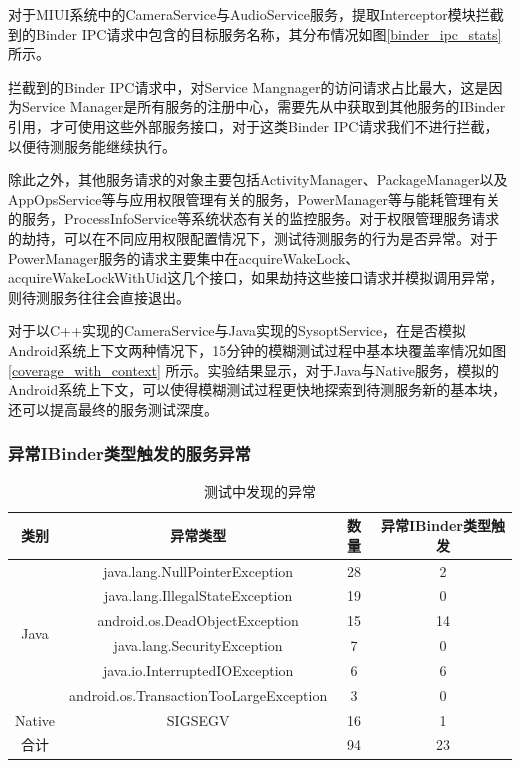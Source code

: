 \documentclass[winfonts,master,twoside]{njuthesis}
\begin{document}
对于MIUI系统中的CameraService与AudioService服务，提取Interceptor模块拦截到的Binder IPC请求中包含的目标服务名称，其分布情况如图\ref{binder_ipc_stats} 所示。

拦截到的Binder IPC请求中，对Service Mangnager的访问请求占比最大，这是因为Service Manager是所有服务的注册中心，需要先从中获取到其他服务的IBinder引用，才可使用这些外部服务接口，对于这类Binder IPC请求我们不进行拦截，以便待测服务能继续执行。

除此之外，其他服务请求的对象主要包括ActivityManager、PackageManager以及AppOpsService等与应用权限管理有关的服务，PowerManager等与能耗管理有关的服务，ProcessInfoService等系统状态有关的监控服务。对于权限管理服务请求的劫持，可以在不同应用权限配置情况下，测试待测服务的行为是否异常。对于PowerManager服务的请求主要集中在acquireWakeLock、acquireWakeLockWithUid这几个接口，如果劫持这些接口请求并模拟调用异常，则待测服务往往会直接退出。


对于以C++实现的CameraService与Java实现的SysoptService，在是否模拟Android系统上下文两种情况下，15分钟的模糊测试过程中基本块覆盖率情况如图\ref{coverage_with_context} 所示。实验结果显示，对于Java与Native服务，模拟的Android系统上下文，可以使得模糊测试过程更快地探索到待测服务新的基本块，还可以提高最终的服务测试深度。

\subsubsection{异常IBinder类型触发的服务异常}

\begin{table}[!htbp]
	\centering
	\begin{tabular}{cccc}
		\toprule
		类别 & 异常类型 & 数量 & 异常IBinder类型触发\\
		\hline
		\multirow{6}{*}{Java} & java.lang.NullPointerException & 28 & 2 \\
		& java.lang.IllegalStateException & 19 & 0 \\
		& android.os.DeadObjectException & 15 & 14 \\
		& java.lang.SecurityException & 7 & 0 \\
		& java.io.InterruptedIOException & 6 & 6 \\
		& android.os.TransactionTooLargeException & 3 & 0 \\
		\hline
		Native & SIGSEGV & 16 & 1 \\
		\midrule
		合计    &         & 94 & 23 \\
		\bottomrule
	\end{tabular}
	\caption{测试中发现的异常}
	\label{tbl:fuzzer_exception_list}
\end{table}
\end{document}
